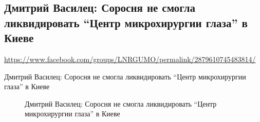 
 
  
\subsection{Дмитрий Василец: Соросня не смогла ликвидировать “Центр микрохирургии глаза” в Киеве}
\label{sec:26_07_2020.fb.lnr.2}
\url{https://www.facebook.com/groups/LNRGUMO/permalink/2879610745483814/}

Дмитрий Василец: Соросня не смогла ликвидировать “Центр микрохирургии глаза” в Киеве

\begin{figure}[ht]
 \centering
 \caption{Дмитрий Василец: Соросня не смогла ликвидировать “Центр микрохирургии глаза” в Киеве}
 \label{fig:}
\end{figure}
  
